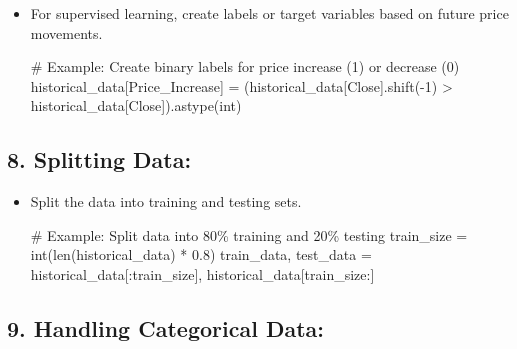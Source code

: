 \documentclass[
  letterpaper,
  DIV=11,
  numbers=noendperiod]{scrreprt}
\newenvironment{Shaded}{\begin{snugshade}}{\end{snugshade}}
\newcommand{\BuiltInTok}[1]{\textcolor[rgb]{0.00,0.23,0.31}{#1}}
\newcommand{\CommentTok}[1]{\textcolor[rgb]{0.37,0.37,0.37}{#1}}
\newcommand{\DecValTok}[1]{\textcolor[rgb]{0.68,0.00,0.00}{#1}}
\newcommand{\FloatTok}[1]{\textcolor[rgb]{0.68,0.00,0.00}{#1}}
\newcommand{\NormalTok}[1]{\textcolor[rgb]{0.00,0.23,0.31}{#1}}
\newcommand{\OperatorTok}[1]{\textcolor[rgb]{0.37,0.37,0.37}{#1}}
\newcommand{\StringTok}[1]{\textcolor[rgb]{0.13,0.47,0.30}{#1}}
\begin{document}
\begin{itemize}
\item
  For supervised learning, create labels or target variables based on
  future price movements.

\begin{Shaded}
\begin{Highlighting}[]
\CommentTok{\# Example: Create binary labels for price increase (1) or decrease (0)}
\NormalTok{historical\_data[}\StringTok{\textquotesingle{}Price\_Increase\textquotesingle{}}\NormalTok{] }\OperatorTok{=}\NormalTok{ (historical\_data[}\StringTok{\textquotesingle{}Close\textquotesingle{}}\NormalTok{].shift(}\OperatorTok{{-}}\DecValTok{1}\NormalTok{) }\OperatorTok{\textgreater{}}\NormalTok{ historical\_data[}\StringTok{\textquotesingle{}Close\textquotesingle{}}\NormalTok{]).astype(}\BuiltInTok{int}\NormalTok{)}
\end{Highlighting}
\end{Shaded}
\end{itemize}

\subsection{\texorpdfstring{8. \textbf{Splitting
Data:}}{8. Splitting Data:}}\label{splitting-data}

\begin{itemize}
\item
  Split the data into training and testing sets.

\begin{Shaded}
\begin{Highlighting}[]
\CommentTok{\# Example: Split data into 80\% training and 20\% testing}
\NormalTok{train\_size }\OperatorTok{=} \BuiltInTok{int}\NormalTok{(}\BuiltInTok{len}\NormalTok{(historical\_data) }\OperatorTok{*} \FloatTok{0.8}\NormalTok{)}
\NormalTok{train\_data, test\_data }\OperatorTok{=}\NormalTok{ historical\_data[:train\_size], historical\_data[train\_size:]}
\end{Highlighting}
\end{Shaded}
\end{itemize}

\subsection{\texorpdfstring{9. \textbf{Handling Categorical
Data:}}{9. Handling Categorical Data:}}\label{handling-categorical-data}
\end{document}
